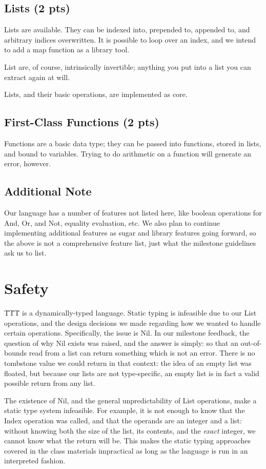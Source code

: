 \documentclass{article}
\begin{document}
\subsection*{Lists (2 pts)}
Lists are available.  They can be indexed into, prepended to, appended to, and arbitrary indices overwritten.  It is possible to loop over an index, and we intend to add a map function as a library tool.

List are, of course, intrinsically invertible; anything you put into a list you can extract again at will.

Lists, and their basic operations, are implemented as core.

\subsection*{First-Class Functions (2 pts)}
Functions are a basic data type; they can be passed into functions, stored in lists, and bound to variables.  Trying to do arithmetic on a function will generate an error, however.

\subsection*{Additional Note}
Our language has a number of features not listed here, like boolean operations for And, Or, and Not, equality evaluation, etc.  We also plan to continue implementing additional features as sugar and library features going forward, so the above is not a comprehensive feature list, just what the milestone guidelines ask us to list.

\section*{Safety}

\"T\"T\"T is a dynamically-typed language.  Static typing is infeasible due to our List operations, and the design decisions we made regarding how we wanted to handle certain operations.  Specifically, the issue is Nil.  In our milestone feedback, the question of why Nil exists was raised, and the answer is simply: so that an out-of-bounds read from a list can return something which is not an error.  There is no tombstone value we could return in that context: the idea of an empty list was floated, but because our lists are not type-specific, an empty list is in fact a valid possible return from any list.

The existence of Nil, and the general unpredictability of List operations, make a static type system infeasible.  For example, it is not enough to know that the Index operation was called, and that the operands are an integer and a list: without knowing both the size of the list, its contents, and the \emph{exact} integer, we cannot know what the return will be.  This makes the static typing approaches covered in the class materials impractical as long as the language is run in an interpreted fashion.
\end{document}
